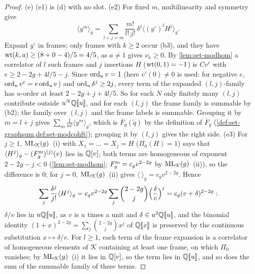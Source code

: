 \begin{proof}
(e) (e1) is (d) with no slot. (e2) For fixed $m$, multilinearity and symmetry give
\[
\langle y^m\rangle_g = \sum_{l+j=m}\frac{m!}{l!\,j!}\,\delta^j\langle(y^\circ)^lH^j\rangle_g .
\]
Expand $y^\circ$ in frames; only frames with $k\geq 2$ occur (b3), and they have $\operatorname{wt}(k,a)\geq(8+0-4)/5 = 4/5$, as $a\neq 1$ gives $\nu_a\geq 0$. By \cref{lem:set-modhom} a correlator of $l$ such frames and $j$ insertions $H$ ($\operatorname{wt}(0,1) = -1$) is $Cv^e$ with $e\geq 2-2g+4l/5-j$. Since $\operatorname{ord}_uv = 1$ (here $v'(0)\neq 0$ is used: for negative $e$, $\operatorname{ord}_uv^e = e\operatorname{ord}_uv$) and $\operatorname{ord}_u\delta^j\geq 2j$, every term of the expanded $(l,j)$-family has $u$-order at least $2-2g+j+4l/5$. So for each $N$ only finitely many $(l,j)$ contribute outside $u^N\mathbb{Q}[\![ u ]\!]$, and for each $(l,j)$ the frame family is summable by (b2); the family over $(l,j)$ and the frame labels is summable. Grouping it by $m = l+j$ gives $\sum_m\frac1{m!}\langle y^m\rangle_g$, which is $\overline F_g(\tilde q)$ by the definition of $\overline F_g$ (\cref{def:set-graphsum,def:set-modcohft}); grouping it by $(l,j)$ gives the right side. (e3) For $j\geq 1$, $\mathrm{ML}_{\mathcal{K}}(g)$~(i) with $X_1 = \dots = X_j = H$ ($\Pi_0(H) = 1$) says that $\langle H^j\rangle_g-(F^{\mathrm{m}}_g)^{(j)}(v)$ lies in $\mathbb{Q}[v]$; both terms are homogeneous of exponent $2-2g-j<0$ (\cref{lem:set-modhom}; $F^{\mathrm{m}}_g = c_gv^{2-2g}$ by $\mathrm{ML}_{\mathcal{K}}(g)$~(ii)), so the difference is $0$; for $j = 0$, $\mathrm{ML}_{\mathcal{K}}(g)$~(ii) gives $\langle\ \rangle_g = c_gv^{2-2g}$. Hence
\[
\sum_j\frac{\delta^j}{j!}\langle H^j\rangle_g = c_gv^{2-2g}\sum_j\binom{2-2g}{j}\Bigl(\frac{\delta}{v}\Bigr)^j = c_g(v+\delta)^{2-2g}:
\]
$\delta/v$ lies in $u\mathbb{Q}[\![ u ]\!]$, as $v$ is $u$ times a unit and $\delta\in u^2\mathbb{Q}[\![ u ]\!]$, and the binomial identity $(1+x)^{2-2g} = \sum_j\binom{2-2g}{j}x^j$ of $\mathbb{Q}[\![ x ]\!]$ is preserved by the continuous substitution $x\mapsto\delta/v$. For $l\geq 1$, each term of the frame expansion is a correlator of homogeneous elements of $\mathcal{K}$ containing at least one frame, on which $\Pi_0$ vanishes; by $\mathrm{ML}_{\mathcal{K}}(g)$~(i) it lies in $\mathbb{Q}[v]$, so the term lies in $\mathbb{Q}[\![ u ]\!]$, and so does the sum of the summable family of these terms.


\end{proof}
